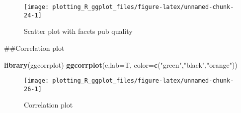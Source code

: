 \documentclass[
]{book}
\newenvironment{Shaded}{\begin{snugshade}}{\end{snugshade}}
\newcommand{\CommentTok}[1]{\textcolor[rgb]{0.56,0.35,0.01}{\textit{#1}}}
\newcommand{\DataTypeTok}[1]{\textcolor[rgb]{0.13,0.29,0.53}{#1}}
\newcommand{\KeywordTok}[1]{\textcolor[rgb]{0.13,0.29,0.53}{\textbf{#1}}}
\newcommand{\NormalTok}[1]{#1}
\newcommand{\OperatorTok}[1]{\textcolor[rgb]{0.81,0.36,0.00}{\textbf{#1}}}
\newcommand{\StringTok}[1]{\textcolor[rgb]{0.31,0.60,0.02}{#1}}
\begin{document}
\begin{figure}

{\centering \texttt{[image: plotting\_R\_ggplot\_files/figure-latex/unnamed-chunk-24-1]} 

}

\caption{Scatter plot with facets pub quality}\label{fig:unnamed-chunk-24}
\end{figure}

\#\#Correlation plot

\begin{Shaded}
\end{Shaded}

\begin{Shaded}
\begin{Highlighting}[]
\KeywordTok{library}\NormalTok{(ggcorrplot)}
\KeywordTok{ggcorrplot}\NormalTok{(c,}\DataTypeTok{lab=}\NormalTok{T, }\DataTypeTok{color=}\KeywordTok{c}\NormalTok{(}\StringTok{"green"}\NormalTok{,}\StringTok{"black"}\NormalTok{,}\StringTok{"orange"}\NormalTok{))}
\end{Highlighting}
\end{Shaded}

\begin{figure}

{\centering \texttt{[image: plotting\_R\_ggplot\_files/figure-latex/unnamed-chunk-26-1]} 

}

\caption{Correlation plot}\label{fig:unnamed-chunk-26}
\end{figure}

  
\end{document}
